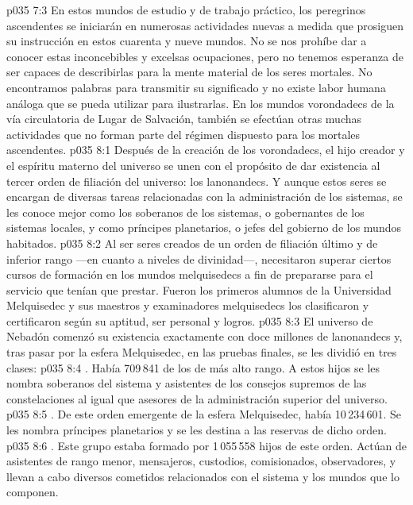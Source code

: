 \vs p035 7:3 En estos mundos de estudio y de trabajo práctico, los peregrinos ascendentes se iniciarán en numerosas actividades nuevas a medida que prosiguen su instrucción en estos cuarenta y nueve mundos. No se nos prohíbe dar a conocer estas inconcebibles y excelsas ocupaciones, pero no tenemos esperanza de ser capaces de describirlas para la mente material de los seres mortales. No encontramos palabras para transmitir su significado y no existe labor humana análoga que se pueda utilizar para ilustrarlas. En los mundos vorondadecs de la vía circulatoria de Lugar de Salvación, también se efectúan otras muchas actividades que no forman parte del régimen dispuesto para los mortales ascendentes.
\vs p035 8:1 Después de la creación de los vorondadecs, el hijo creador y el espíritu materno del universo se unen con el propósito de dar existencia al tercer orden de filiación del universo: los lanonandecs. Y aunque estos seres se encargan de diversas tareas relacionadas con la administración de los sistemas, se les conoce mejor como los soberanos de los sistemas, o gobernantes de los sistemas locales, y como príncipes planetarios, o jefes del gobierno de los mundos habitados.
\vs p035 8:2 Al ser seres creados de un orden de filiación último y de inferior rango ---en cuanto a niveles de divinidad---, necesitaron superar ciertos cursos de formación en los mundos melquisedecs a fin de prepararse para el servicio que tenían que prestar. Fueron los primeros alumnos de la Universidad Melquisedec y sus maestros y examinadores melquisedecs los clasificaron y certificaron según su aptitud, ser personal y logros.
\vs p035 8:3 El universo de Nebadón comenzó su existencia exactamente con doce millones de lanonandecs y, tras pasar por la esfera Melquisedec, en las pruebas finales, se les dividió en tres clases:
\vs p035 8:4 . Había 709\,841 de los de más alto rango. A estos hijos se les nombra soberanos del sistema y asistentes de los consejos supremos de las constelaciones al igual que asesores de la administración superior del universo.
\vs p035 8:5 . De este orden emergente de la esfera Melquisedec, había 10\,234\,601. Se les nombra príncipes planetarios y se les destina a las reservas de dicho orden.
\vs p035 8:6 . Este grupo estaba formado por 1\,055\,558 hijos de este orden. Actúan de asistentes de rango menor, mensajeros, custodios, comisionados, observadores, y llevan a cabo diversos cometidos relacionados con el sistema y los mundos que lo componen.
